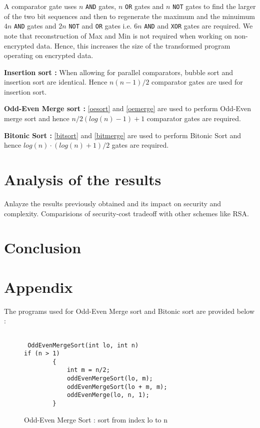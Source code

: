 \documentclass{acm_proc_article-sp}
\begin{document}
A comparator gate uses $n$ \texttt{AND} gates, $n$ \texttt{OR} gates and $n$ \texttt{NOT} gates to find the larger of the two bit sequences and then to regenerate the maximum and the minuimum $4n$ \texttt{AND} gates and $2n$ \texttt{NOT} and \texttt{OR} gates i.e. $6n$ \texttt{AND} and \texttt{XOR} gates are required. We note that reconstruction of Max and  Min is not required when working on non-encrypted data. Hence, this increases the size of the transformed program operating on encrypted data.

\textbf{Insertion sort :} When allowing for parallel comparators, bubble sort and insertion sort are identical. Hence $n(n-1)/2$ comparator gates are used for insertion sort.

\textbf{Odd-Even Merge sort :} \autoref{oesort} and \autoref{oemerge} are used to perform Odd-Even merge sort and hence  $n/2(log(n)-1) + 1 $ comparator gates are required. 


\textbf{Bitonic Sort :} \autoref{bitsort} and \autoref{bitmerge} are used to perform Bitonic Sort and hence $log(n) · (log(n)+1) / 2 $ gates are required.


\lstset{                                    %
  language=C,
  frame=lines,
  captionpos=b
 }


\renewcommand{\lstlistingname}{Code}

\section{Analysis of the results}

Anlayze the results previously obtained and its impact on security and complexity. Comparisions of security-cost tradeoff with other schemes like RSA.
\section{Conclusion}




  

\section{Appendix}

 The programs used for Odd-Even Merge sort and Bitonic sort are provided below : 


\begin{figure}[h]
\begin{lstlisting}[label = oesort ]

 OddEvenMergeSort(int lo, int n)
if (n > 1)
        {
            int m = n/2;
            oddEvenMergeSort(lo, m);
            oddEvenMergeSort(lo + m, m);
            oddEvenMerge(lo, n, 1);
        }

\end{lstlisting}
\caption{Odd-Even Merge Sort : sort from index lo to n }
\end{figure}
\end{document}

